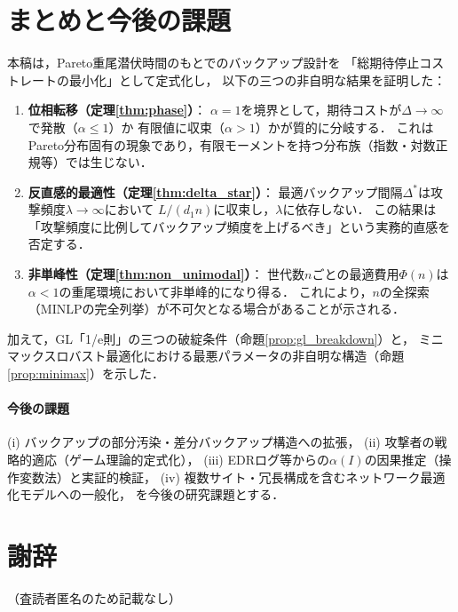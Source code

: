 \documentclass[12pt,a4paper]{article}
\theoremstyle{plain}
\theoremstyle{definition}
\theoremstyle{remark}
\newcommand{\Dopt}{\Delta^*}
\begin{document}
\section{まとめと今後の課題}
\label{sec:conclusion}

本稿は，Pareto重尾潜伏時間のもとでのバックアップ設計を
「総期待停止コストレートの最小化」として定式化し，
以下の三つの非自明な結果を証明した：

\begin{enumerate}
\item \textbf{位相転移（定理\ref{thm:phase}）}：
  $\alpha=1$を境界として，期待コストが$\Delta\to\infty$で発散（$\alpha\le1$）か
  有限値に収束（$\alpha>1$）かが質的に分岐する．
  これはPareto分布固有の現象であり，有限モーメントを持つ分布族（指数・対数正規等）では生じない．

\item \textbf{反直感的最適性（定理\ref{thm:delta_star}）}：
  最適バックアップ間隔$\Dopt$は攻撃頻度$\lambda\to\infty$において
  $L/(d_1 n)$に収束し，$\lambda$に依存しない．
  この結果は「攻撃頻度に比例してバックアップ頻度を上げるべき」という実務的直感を否定する．

\item \textbf{非単峰性（定理\ref{thm:non_unimodal}）}：
  世代数$n$ごとの最適費用$\Phi(n)$は$\alpha<1$の重尾環境において非単峰的になり得る．
  これにより，$n$の全探索（MINLPの完全列挙）が不可欠となる場合があることが示される．
\end{enumerate}

加えて，GL「1/e則」の三つの破綻条件（命題\ref{prop:gl_breakdown}）と，
ミニマックスロバスト最適化における最悪パラメータの非自明な構造（命題\ref{prop:minimax}）を示した．

\paragraph{今後の課題}
(i) バックアップの部分汚染・差分バックアップ構造への拡張，
(ii) 攻撃者の戦略的適応（ゲーム理論的定式化），
(iii) EDRログ等からの$\alpha(I)$の因果推定（操作変数法）と実証的検証，
(iv) 複数サイト・冗長構成を含むネットワーク最適化モデルへの一般化，
を今後の研究課題とする．

\section*{謝辞}
（査読者匿名のため記載なし）
\end{document}
